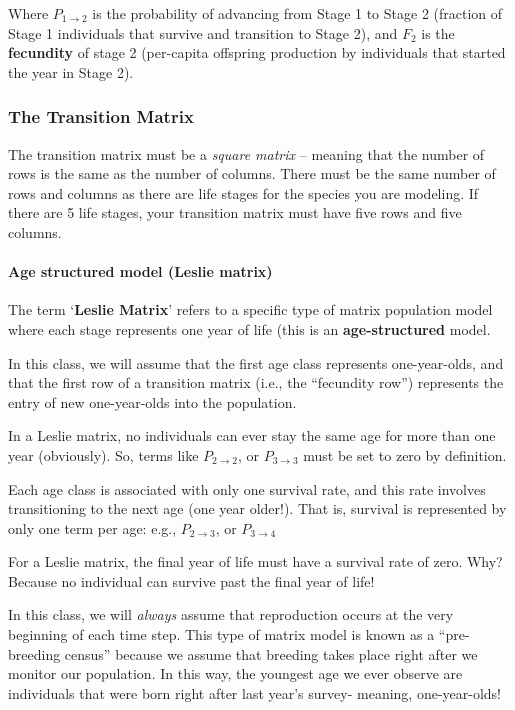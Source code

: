 \documentclass[
]{article}
\begin{document}
Where \(P_{1 \rightarrow 2}\) is the probability of advancing from Stage
1 to Stage 2 (fraction of Stage 1 individuals that survive and
transition to Stage 2), and \(F_2\) is the \textbf{fecundity} of stage 2
(per-capita offspring production by individuals that started the year in
Stage 2).

\hypertarget{the-transition-matrix}{%
\subsubsection{The Transition Matrix}\label{the-transition-matrix}}

The transition matrix must be a \emph{square matrix} -- meaning that the
number of rows is the same as the number of columns. There must be the
same number of rows and columns as there are life stages for the species
you are modeling. If there are 5 life stages, your transition matrix
must have five rows and five columns.

\hypertarget{age-structured-model-leslie-matrix}{%
\paragraph{Age structured model (Leslie
matrix)}\label{age-structured-model-leslie-matrix}}

The term `\textbf{Leslie Matrix}' refers to a specific type of matrix
population model where each stage represents one year of life (this is
an \textbf{age-structured} model.

In this class, we will assume that the first age class represents
one-year-olds, and that the first row of a transition matrix (i.e., the
``fecundity row'') represents the entry of new one-year-olds into the
population.

In a Leslie matrix, no individuals can ever stay the same age for more
than one year (obviously). So, terms like \(P_{2 \rightarrow 2}\), or
\(P_{3 \rightarrow 3}\) must be set to zero by definition.

Each age class is associated with only one survival rate, and this rate
involves transitioning to the next age (one year older!). That is,
survival is represented by only one term per age: e.g.,
\(P_{2 \rightarrow 3}\), or \(P_{3 \rightarrow 4}\)

For a Leslie matrix, the final year of life must have a survival rate of
zero. Why? Because no individual can survive past the final year of
life!

In this class, we will \emph{always} assume that reproduction occurs at
the very beginning of each time step. This type of matrix model is known
as a ``pre-breeding census'' because we assume that breeding takes place
right after we monitor our population. In this way, the youngest age we
ever observe are individuals that were born right after last year's
survey- meaning, one-year-olds!
\end{document}
